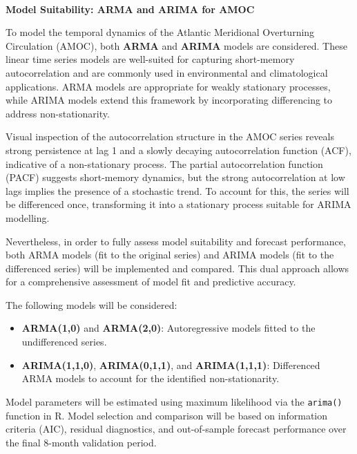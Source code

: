 \documentclass[
  11pt,
]{article}
\makeatletter
\let\oldparagraph\paragraph
\renewcommand{\paragraph}{
    \@ifstar
      \xxxParagraphStar
      \xxxParagraphNoStar
  }
\newcommand{\xxxParagraphStar}[1]{\oldparagraph*{#1}\mbox{}}
\newcommand{\xxxParagraphNoStar}[1]{\oldparagraph{#1}\mbox{}}
\makeatother
\begin{document}
\paragraph{\texorpdfstring{\textbf{Model Suitability: ARMA and ARIMA for
AMOC}}{Model Suitability: ARMA and ARIMA for AMOC}}\label{model-suitability-arma-and-arima-for-amoc}

To model the temporal dynamics of the Atlantic Meridional Overturning
Circulation (AMOC), both \textbf{ARMA} and \textbf{ARIMA} models are
considered. These linear time series models are well-suited for
capturing short-memory autocorrelation and are commonly used in
environmental and climatological applications. ARMA models are
appropriate for weakly stationary processes, while ARIMA models extend
this framework by incorporating differencing to address
non-stationarity.

Visual inspection of the autocorrelation structure in the AMOC series
reveals strong persistence at lag 1 and a slowly decaying
autocorrelation function (ACF), indicative of a non-stationary process.
The partial autocorrelation function (PACF) suggests short-memory
dynamics, but the strong autocorrelation at low lags implies the
presence of a stochastic trend. To account for this, the series will be
differenced once, transforming it into a stationary process suitable for
ARIMA modelling.

Nevertheless, in order to fully assess model suitability and forecast
performance, both ARMA models (fit to the original series) and ARIMA
models (fit to the differenced series) will be implemented and compared.
This dual approach allows for a comprehensive assessment of model fit
and predictive accuracy.

The following models will be considered:

\begin{itemize}
\item
  \textbf{ARMA(1,0)} and \textbf{ARMA(2,0)}: Autoregressive models
  fitted to the undifferenced series.
\item
  \textbf{ARIMA(1,1,0)}, \textbf{ARIMA(0,1,1)}, and
  \textbf{ARIMA(1,1,1)}: Differenced ARMA models to account for the
  identified non-stationarity.
\end{itemize}

Model parameters will be estimated using maximum likelihood via the
\texttt{arima()} function in R. Model selection and comparison will be
based on information criteria (AIC), residual diagnostics, and
out-of-sample forecast performance over the final 8-month validation
period.
\end{document}
